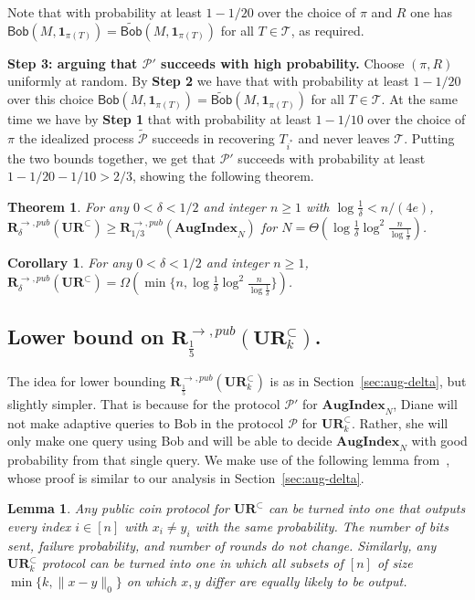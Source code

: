 \documentclass[11pt]{article}
\newtheorem{theorem}{Theorem}
\newtheorem{lemma}{Lemma}
\newtheorem{corollary}{Corollary}
\newcommand{\query}{\mathsf{Bob}}
\newcommand{\aug}{\mathbf{AugIndex}\xspace}
\newcommand{\ur}{\mathbf{UR}\xspace}
\newcommand{\randcom}{\mathbf{R}}
\begin{document}
Note that with probability at least $1-1/20$ over the choice of $\pi$ and $R$ one has $\query(M, \mathbf{1}_{\pi(T)})=\widetilde{\query}(M, \mathbf{1}_{\pi(T)})$ for all $T\in \mathcal{T}$, as required.


{\bf Step 3: arguing that $\mathcal{P}'$ succeeds with high probability.}  Choose $(\pi, R)$ uniformly at random. By {\bf Step 2} we have that with probability at least $1-1/20$ over this choice 
$\query(M, \mathbf{1}_{\pi(T)})=\widetilde{\query}(M, \mathbf{1}_{\pi(T)})$ for all $T\in \mathcal{T}$. At the same time we have by {\bf Step 1} that with probability at least $1-1/10$ over the choice of $\pi$ the idealized process $\widetilde{\mathcal{P}}$ 
succeeds in recovering $T_{i^*}$ and never leaves $\mathcal{T}$. Putting the two bounds together, we get that $\mathcal{P}'$ succeeds with probability at least $1-1/20-1/10>2/3$, showing the following theorem.


\begin{theorem}
For any $0<\delta<1/2$ and integer $n\ge 1$ with $\log \frac 1{\delta} < n/(4e)$, $\randcom^{\rightarrow,pub}_\delta(\ur^\subset) \ge \randcom^{\rightarrow,pub}_{1/3}(\aug_N)$ for $N = \Theta(\log\frac 1{\delta} \log^2 \frac n{\log \frac 1{\delta}})$.
\end{theorem}

\begin{corollary}
For any $0<\delta<1/2$ and integer $n\ge 1$, $\randcom^{\rightarrow,pub}_\delta(\ur^\subset) = \Omega(\min\{n, \log\frac 1{\delta} \log^2 \frac n{\log \frac 1{\delta}}\})$.
\end{corollary}

\subsection{Lower bound on $\randcom^{\rightarrow,pub}_{\frac 15}(\ur_k^\subset)$.}\label{sec:aug-k}

The idea for lower bounding $\randcom^{\rightarrow,pub}_{\frac 15}(\ur_k^\subset)$ is as in Section~\ref{sec:aug-delta}, but slightly simpler. That is because for the protocol $\mathcal P'$ for $\aug_N$, Diane will not make adaptive queries to Bob in the protocol $\mathcal P$ for $\ur_k^\subset$. Rather, she will only make one query using Bob and will be able to decide $\aug_N$ with good probability from that single query. We  make use of the following lemma from~\cite{JowhariST11}, whose proof is similar to our analysis in Section~\ref{sec:aug-delta}.

\begin{lemma}{\cite{JowhariST11}}\label{lem:rand-ur}
Any public coin protocol for $\ur^\subset$ can be turned into one that outputs every index $i\in[n]$ with $x_i\neq y_i$ with the same probability. The number of bits sent, failure probability, and number of rounds do not change. Similarly, any $\ur_k^\subset$ protocol can be turned into one in which all subsets of $[n]$ of size $\min\{k, \|x-y\|_0\}$ on which $x, y$ differ are equally likely to be output.
\end{lemma}
\end{document}
